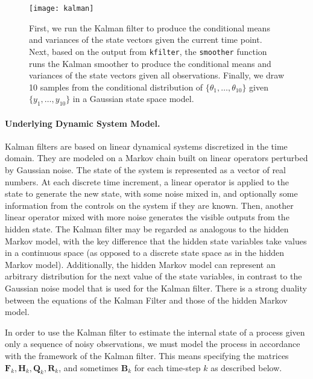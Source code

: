 \begin{figure}[tb]
  \centering
  \texttt{[image: kalman]}
  \caption[Kalman Filtering and Smoothing]{First, we run the Kalman filter to produce the conditional means and variances of the state vectors given the current time point. Next, based on the output from \texttt{kfilter}, the \texttt{smoother} function runs the Kalman smoother to produce the conditional means and variances of the state vectors given all observations. Finally, we draw 10 samples from the conditional distribution of $\{\theta_1, \ldots, \theta_{10}\}$ given $\{y_1, \ldots ,y_{10}\}$ in a Gaussian state space model.}
  \label{figure:kalman}
\end{figure}

\paragraph{Underlying Dynamic System Model.}
Kalman filters are based on linear dynamical systems discretized in the time domain. They are modeled on a Markov chain built on linear operators perturbed by Gaussian noise. The state of the system is represented as a vector of real numbers. At each discrete time increment, a linear operator is applied to the state to generate the new state, with some noise mixed in, and optionally some information from the controls on the system if they are known. Then, another linear operator mixed with more noise generates the visible outputs from the hidden state. The Kalman filter may be regarded as analogous to the hidden Markov model, with the key difference that the hidden state variables take values in a continuous space (as opposed to a discrete state space as in the hidden Markov model). Additionally, the hidden Markov model can represent an arbitrary distribution for the next value of the state variables, in contrast to the Gaussian noise model that is used for the Kalman filter. There is a strong duality between the equations of the Kalman Filter and those of the hidden Markov model.

In order to use the Kalman filter to estimate the internal state of a process given only a sequence of noisy observations, we must model the process in accordance with the framework of the Kalman filter. This means specifying the matrices $\mathbf{F}_k, \mathbf{H}_k, \mathbf{Q}_k, \mathbf{R}_k$, and sometimes $\mathbf{B}_k$ for each time-step $k$ as described below.

